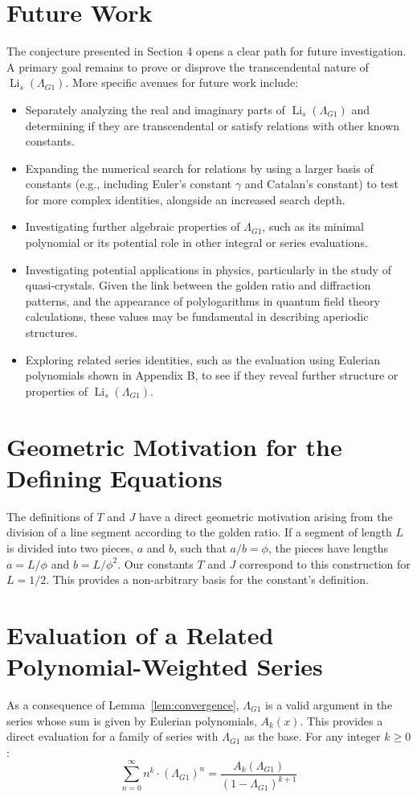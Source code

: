 \documentclass{amsart}
\theoremstyle{plain}
\theoremstyle{definition}
\theoremstyle{remark}
\DeclareMathOperator{\Li}{Li} %
\newcommand{\LambdaG}{\Lambda_{G1}}
\newcommand{\phiG}{\phi}
\begin{document}
\section{Future Work}
The conjecture presented in Section 4 opens a clear path for future investigation. A primary goal remains to prove or disprove the transcendental nature of $\Li_s(\LambdaG)$. More specific avenues for future work include:
\begin{itemize}
    \item Separately analyzing the real and imaginary parts of $\Li_s(\LambdaG)$ and determining if they are transcendental or satisfy relations with other known constants.
    \item Expanding the numerical search for relations by using a larger basis of constants (e.g., including Euler's constant $\gamma$ and Catalan's constant) to test for more complex identities, alongside an increased search depth.
    \item Investigating further algebraic properties of $\LambdaG$, such as its minimal polynomial or its potential role in other integral or series evaluations.
    \item Investigating potential applications in physics, particularly in the study of quasi-crystals. Given the link between the golden ratio and diffraction patterns, and the appearance of polylogarithms in quantum field theory calculations, these values may be fundamental in describing aperiodic structures.
    \item Exploring related series identities, such as the evaluation using Eulerian polynomials shown in Appendix B, to see if they reveal further structure or properties of $\Li_s(\LambdaG)$.
\end{itemize}

\appendix
\section{Geometric Motivation for the Defining Equations}
The definitions of $T$ and $J$ have a direct geometric motivation arising from the division of a line segment according to the golden ratio. If a segment of length $L$ is divided into two pieces, $a$ and $b$, such that $a/b = \phiG$, the pieces have lengths $a=L/\phiG$ and $b=L/\phiG^2$. Our constants $T$ and $J$ correspond to this construction for $L=1/2$. This provides a non-arbitrary basis for the constant's definition.

\section{Evaluation of a Related Polynomial-Weighted Series}
As a consequence of Lemma~\ref{lem:convergence}, $\LambdaG$ is a valid argument in the series whose sum is given by Eulerian polynomials, $A_k(x)$. This provides a direct evaluation for a family of series with $\LambdaG$ as the base. For any integer $k \ge 0$:
\[ \sum_{n=0}^{\infty} n^k \cdot (\LambdaG)^n = \frac{A_k(\LambdaG)}{(1-\LambdaG)^{k+1}} \]
\end{document}
